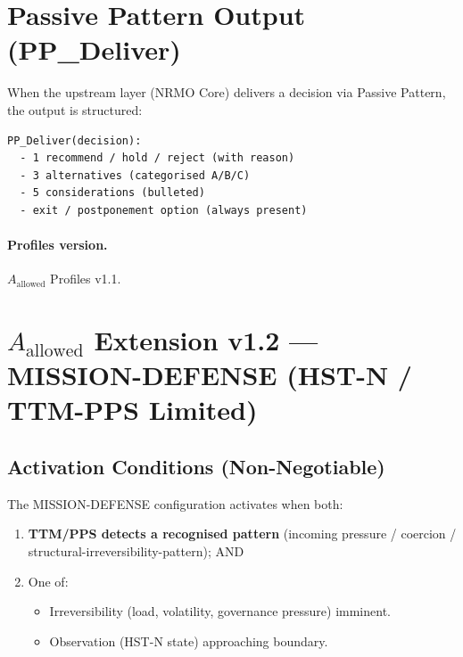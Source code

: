 \section{Passive Pattern Output (PP\_Deliver)}
\label{sec:a-allowed-pp-deliver}

When the upstream layer (NRMO Core) delivers a decision via Passive
Pattern, the output is structured:

\begin{lstlisting}[basicstyle=\ttfamily\small,frame=single]
PP_Deliver(decision):
  - 1 recommend / hold / reject (with reason)
  - 3 alternatives (categorised A/B/C)
  - 5 considerations (bulleted)
  - exit / postponement option (always present)
\end{lstlisting}

\paragraph{Profiles version.}
$A_{\mathrm{allowed}}$ Profiles v1.1.

\section{$A_{\mathrm{allowed}}$ Extension v1.2 --- MISSION-DEFENSE
(HST-N / TTM-PPS Limited)}
\label{sec:a-allowed-extension}


\subsection{Activation Conditions (Non-Negotiable)}
\label{sec:a-allowed-mdef-conditions}

The MISSION-DEFENSE configuration activates when both:

\begin{enumerate}
\item \textbf{TTM/PPS detects a recognised pattern} (incoming
pressure / coercion / structural-irreversibility-pattern); AND
\item One of:
\begin{itemize}
\item Irreversibility (load, volatility, governance pressure)
imminent.
\item Observation (HST-N state) approaching boundary.
\end{itemize}
\end{enumerate}

